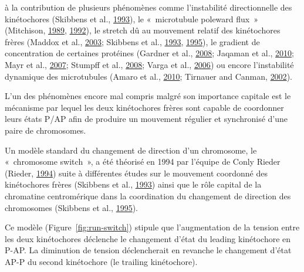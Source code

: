 \documentclass[12pt,a4paper,twoside,openright]{book}
\begin{document}
\begin{itemize}
  à la contribution de plusieurs phénomènes comme l'instabilité
  directionnelle des kinétochores (Skibbens et al.,
  \protect\hyperlink{ref-Skibbens1993}{1993}), le «~microtubule poleward
  flux~» (Mitchison, \protect\hyperlink{ref-Mitchison1989}{1989},
  \protect\hyperlink{ref-Mitchison1992}{1992}), le stretch dû au
  mouvement relatif des kinétochores frères (Maddox et al.,
  \protect\hyperlink{ref-Maddox2003}{2003}; Skibbens et al.,
  \protect\hyperlink{ref-Skibbens1993}{1993},
  \protect\hyperlink{ref-Skibbens1995}{1995}), le gradient de
  concentration de certaines protéines (Gardner et al.,
  \protect\hyperlink{ref-Gardner2008a}{2008}; Jaqaman et al.,
  \protect\hyperlink{ref-Jaqaman2010}{2010}; Mayr et al.,
  \protect\hyperlink{ref-Mayr2007}{2007}; Stumpff et al.,
  \protect\hyperlink{ref-Stumpff2008}{2008}; Varga et al.,
  \protect\hyperlink{ref-Varga2006}{2006}) ou encore l'instabilité
  dynamique des microtubules (Amaro et al.,
  \protect\hyperlink{ref-Amaro2010a}{2010}; Tirnauer and Canman,
  \protect\hyperlink{ref-Tirnauer2002}{2002}).
\end{itemize}

L'un des phénomènes encore mal compris malgré son importance capitale
est le mécanisme par lequel les deux kinétochores frères sont capable de
coordonner leurs états P/AP afin de produire un mouvement régulier et
synchronisé d'une paire de chromosomes.

Un modèle standard du changement de direction d'un chromosome, le
«~chromosome switch~», a été théorisé en 1994 par l'équipe de Conly
Rieder (Rieder, \protect\hyperlink{ref-Rieder1994}{1994}) suite à
différentes études sur le mouvement coordonné des kinétochores frères
(Skibbens et al., \protect\hyperlink{ref-Skibbens1993}{1993}) ainsi que
le rôle capital de la chromatine centromérique dans la coordination du
changement de direction des chromosomes (Skibbens et al.,
\protect\hyperlink{ref-Skibbens1995}{1995}).

Ce modèle (Figure~\ref{fig:run-switch}) stipule que l'augmentation de la
tension entre les deux kinétochores déclenche le changement d'état du
leading kinétochore en P-AP. La diminution de tension déclencherait en
revanche le changement d'état AP-P du second kinétochore (le trailing
kinétochore).
\end{document}
